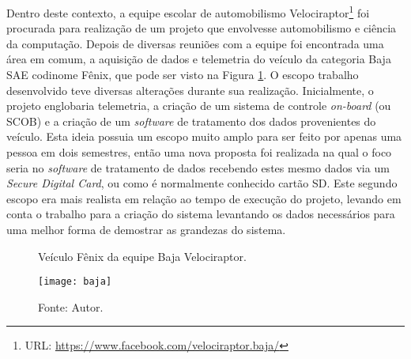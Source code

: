Dentro deste contexto, a equipe escolar de automobilismo Velociraptor\footnote{URL: \url{https://www.facebook.com/velociraptor.baja/}} foi procurada para realização de um projeto que envolvesse automobilismo e ciência da computação. Depois de diversas reuniões com a equipe foi encontrada uma área em comum, a aquisição de dados e telemetria do veículo da categoria Baja SAE codinome Fênix, que pode ser visto na Figura \ref{fig:Baja}. 
O escopo trabalho desenvolvido teve diversas alterações durante sua realização. Inicialmente, o projeto englobaria telemetria, a criação de um sistema de controle \textit{on-board} (ou SCOB) e a criação de um \textit{software} de tratamento dos dados provenientes do veículo. Esta ideia possuia um escopo muito amplo para ser feito por apenas uma pessoa em dois semestres, então uma nova proposta foi realizada na qual o foco seria no \textit{software} de tratamento de dados recebendo estes mesmo dados via um \textit{Secure Digital Card}, ou como é normalmente conhecido cartão SD. Este segundo escopo era mais realista em relação ao tempo de execução do projeto, levando em conta o trabalho para a criação do sistema levantando os dados necessários para uma melhor forma de demostrar as grandezas do sistema.   

\begin{figure}[!htb]
	\centering
		\caption{Veículo Fênix da equipe Baja Velociraptor.}
		\texttt{[image: baja]} 
		\caption*{Fonte: Autor.}
		\label{fig:Baja}
\end{figure} 

